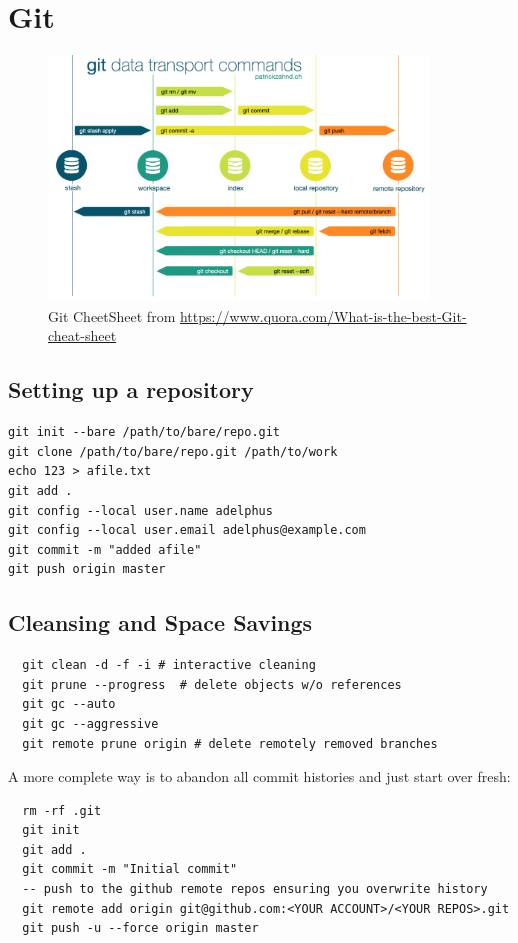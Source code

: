 \section{Git}

\begin{figure}[ht]
  \begin{center}
  \includegraphics[keepaspectratio,width=0.9\textwidth]{Pictures/git-cheatsheet1.png}
  \caption{Git CheetSheet from
    \url{https://www.quora.com/What-is-the-best-Git-cheat-sheet}}
  \label{fig:HardwareStructure}
  \end{center}
\end{figure}

\subsection{Setting up a repository}

\begin{verbatim}
git init --bare /path/to/bare/repo.git
git clone /path/to/bare/repo.git /path/to/work
echo 123 > afile.txt
git add .
git config --local user.name adelphus
git config --local user.email adelphus@example.com
git commit -m "added afile"
git push origin master
\end{verbatim}

\subsection{Cleansing and Space Savings}

\begin{verbatim}
  git clean -d -f -i # interactive cleaning 
  git prune --progress  # delete objects w/o references
  git gc --auto
  git gc --aggressive  
  git remote prune origin # delete remotely removed branches 
\end{verbatim}

A more complete way is to abandon all commit histories and just start over fresh:
\begin{verbatim}
  rm -rf .git
  git init
  git add .
  git commit -m "Initial commit"
  -- push to the github remote repos ensuring you overwrite history
  git remote add origin git@github.com:<YOUR ACCOUNT>/<YOUR REPOS>.git
  git push -u --force origin master
\end{verbatim}

